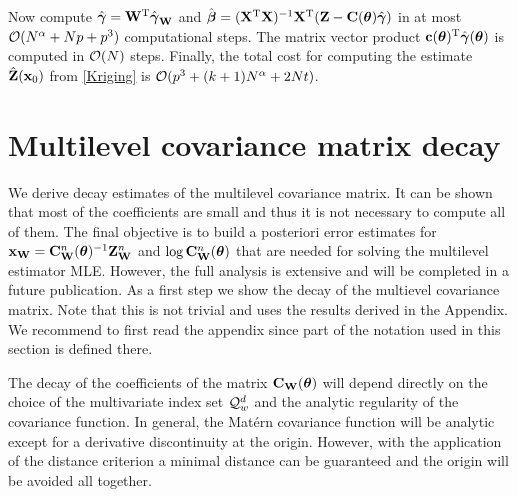\documentclass[11pt,final]{amsart}       %
\begin{document}
Now compute $\hat {\boldsymbol{\gamma}} = \mathbf{W}^{\rm T} \hat {\boldsymbol{\gamma}}_{\mathbf{W}}$ and $\hat{\boldsymbol{\beta}} =
(\mathbf{X}^{\rm T} \mathbf{X})^{-1}\mathbf{X} ^{\rm T} (\mathbf{Z} - \mathbf{C}(\boldsymbol{\theta})\hat{\boldsymbol{\gamma}})$ in at most
${\mathcal O}(N^{\alpha} + Np + p^{3})$ computational steps. The matrix vector
product $\mathbf{c}(\boldsymbol{\theta})^{\rm T} \hat{\boldsymbol{\gamma}}(\boldsymbol{\theta})$ is computed in
${\mathcal O}(N)$ steps.  Finally, the total cost for computing the estimate
$\hat{\mathbf{Z}}(\mathbf{x}_0)$ from \eqref{Kriging} is ${\mathcal O}(p^{3} + (k +
1)N^{\alpha} + 2Nt)$.

\section{Multilevel covariance matrix decay}
\label{errorestimates}

We derive decay estimates of the multilevel covariance matrix. It can
be shown that most of the coefficients are small and thus it is not
necessary to compute all of them. The final objective is to build a
posteriori error estimates for $\mathbf{x}_{\mathbf{W}} =
\mathbf{C}^{n}_{\mathbf{W}}(\boldsymbol{\theta})^{-1}\mathbf{Z}^n_{\mathbf{W}}$ and $\log
\mathbf{C}^{n}_{\mathbf{W}}(\boldsymbol{\theta})$ that are needed for solving the multilevel
estimator MLE. However, the full analysis is extensive and will be
completed in a future publication. As a first step we show the decay
of the multievel covariance matrix. Note that this is not trivial and
uses the results derived in the Appendix. We recommend to first read
the appendix since part of the notation used in this section is
defined there.






The decay of the coefficients of the matrix $\mathbf{C}_{\mathbf{W}}(\boldsymbol{\theta})$ will
depend directly on the choice of the multivariate index set
${\mathcal Q}^{d}_{w}$ and the analytic regularity of the covariance
function. In general, the Mat\'{e}rn covariance function will be
analytic except for a derivative discontinuity at the
origin. However, with the application of the distance criterion a
minimal distance can be guaranteed and the origin will be avoided all
together.
\end{document}
